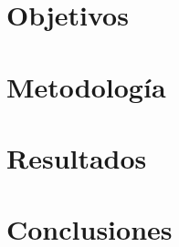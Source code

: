 \documentclass{article}
\begin{document}
\section{Objetivos}

\section{Metodología}

\section{Resultados}

\section{Conclusiones}

\printbibliography
\end{document}

